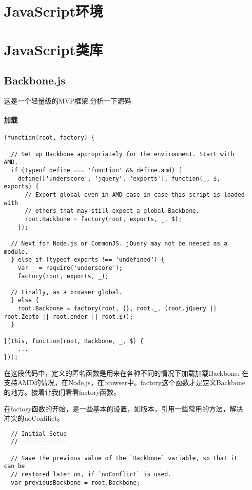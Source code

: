 \documentclass[12pt, oneside, b5paper]{book}
\begin{document}
\begin{CJK}{UTF8}{gkai}
		\section{JavaScript环境}
		\section{JavaScript类库}
		\subsection{Backbone.js}	
		这是一个轻量级的MVP框架.分析一下源码.

    \paragraph{加载}
		
		\begin{lstlisting}
(function(root, factory) {

  // Set up Backbone appropriately for the environment. Start with AMD.
  if (typeof define === 'function' && define.amd) {
    define(['underscore', 'jquery', 'exports'], function(_, $, exports) {
      // Export global even in AMD case in case this script is loaded with
      // others that may still expect a global Backbone.
      root.Backbone = factory(root, exports, _, $);
    });

  // Next for Node.js or CommonJS. jQuery may not be needed as a module.
  } else if (typeof exports !== 'undefined') {
    var _ = require('underscore');
    factory(root, exports, _);

  // Finally, as a browser global.
  } else {
    root.Backbone = factory(root, {}, root._, (root.jQuery || root.Zepto || root.ender || root.$));
  }

}(this, function(root, Backbone, _, $) {
	...
}));
		\end{lstlisting}

		在这段代码中，定义的匿名函数是用来在各种不同的情况下加载加载Backbone. 在支持AMD的情况，在Node.js，在browser中。factory这个函数才是定义Backbone的地方。接着让我们看看factory函数。


		在factory函数的开始，是一些基本的设置，如版本，引用一些常用的方法，解决冲突的noConfilict。

		\begin{lstlisting}
  // Initial Setup
  // -------------

  // Save the previous value of the `Backbone` variable, so that it can be
  // restored later on, if `noConflict` is used.
  var previousBackbone = root.Backbone;


\end{lstlisting}
\end{CJK}
\end{document}
